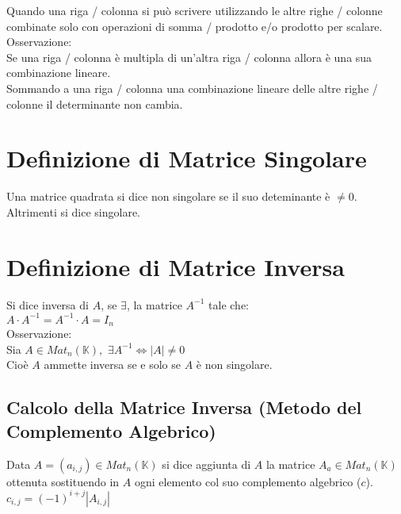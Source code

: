\documentclass[a4paper, twoside, italian, 11pt]{book}
\newcommand{\detm}[1] {\left | #1 \right |}
\newcommand{\K}{\mathbb K}
\begin{document}
Quando una riga / colonna si può scrivere utilizzando le altre righe / colonne combinate solo con operazioni di somma / prodotto e/o prodotto per scalare. \\

\noindent
Osservazione: \\
Se una riga / colonna è multipla di un'altra riga / colonna allora è una sua combinazione lineare. \\

\noindent
Sommando a una riga / colonna una combinazione lineare delle altre righe / colonne il determinante non cambia. \\



\section{Definizione di Matrice Singolare}
Una matrice quadrata si dice non singolare se il suo deteminante è $\neq 0$. Altrimenti si dice singolare.



\section{Definizione di Matrice Inversa}

Si dice inversa di $A$, se $\exists$, la matrice $A^{-1}$ tale che: \\

\noindent
$A \cdot A^{-1} = A^{-1} \cdot A = I_n$ \\

\noindent
Osservazione: \\
Sia $A \in Mat_n(\K),$ $\exists A^{-1} \iff \detm A \neq 0$ \\

\noindent
Cioè $A$ ammette inversa se e solo se $A$ è non singolare.


\subsection{Calcolo della Matrice Inversa (Metodo del Complemento Algebrico)}

Data $A = (a_{i,j}) \in Mat_n(\K)$ si dice aggiunta di $A$ la matrice $A_a \in Mat_n(\K)$ ottenuta sostituendo in $A$ ogni elemento col suo complemento algebrico ($c$). \\

\noindent
$c_{i,j} = (-1)^{i+j} \detm{A_{i,j}}$ \\
\end{document}
